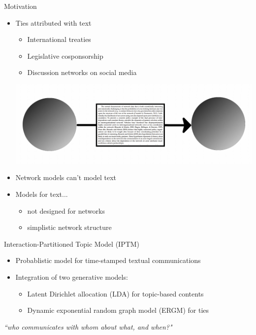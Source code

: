 \documentclass[10pt, xcolor=table]{beamer}
\def\bni{\begin{itemize}} \def\ei{\end{itemize}}
\theoremstyle{definition}
\theoremstyle{remark}
\begin{document}
\begin{frame}{Motivation}
\Large
\begin{itemize}
\item Ties attributed with text
\begin{itemize}
\item International treaties
\item Legislative cosponsorship
\item Discussion networks on social media
\end{itemize}

\begin{center}
\includegraphics[scale=.2]{figures/tieWords}
\end{center} \vspace{-.1cm}
\item Network models can't model text
\vspace{.3cm}
\item Models for text...
\begin{itemize}
\item not designed for networks
\item simplistic network structure
\end{itemize}
\end{itemize}
\end{frame}

\begin{frame}{Interaction-Partitioned Topic Model (IPTM)}
\large
	\bni
	\item Probablistic model for time-stamped textual communications 
	\vspace{0.2cm}
	\item Integration of two generative models:
	\begin{itemize}
	 \item Latent Dirichlet allocation (LDA) for topic-based contents
	  \item Dynamic exponential random graph model (ERGM) for ties 
	  \end{itemize}
	\ei
		\vspace{0.4cm}
\centering \large\textit{``who communicates with whom about what, and when?"}
\end{frame}
\end{document}
